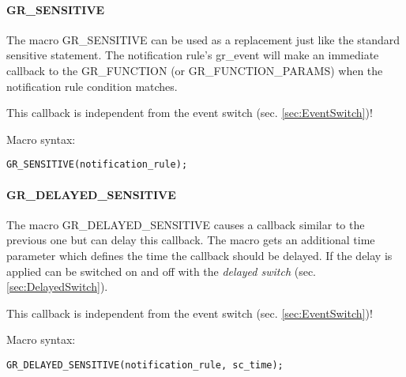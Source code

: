 \paragraph{{\sffamily GR\_SENSITIVE}} The macro {\sffamily GR\_SENSITIVE} can be used as a replacement just like the standard sensitive statement. The notification rule's {\sffamily gr\_event} will make an immediate callback to the {\sffamily GR\_FUNCTION} (or {\sffamily GR\_FUNCTION\_PARAMS}) when the notification rule condition matches. 

This callback is independent from the event switch (sec. \ref{sec:EventSwitch})!

\noindent
\begin{minipage}{\textwidth}
Macro syntax:
\vspace{-1ex}
\begin{lstlisting}
GR_SENSITIVE(notification_rule);
\end{lstlisting}
\end{minipage}

\paragraph{{\sffamily GR\_DELAYED\_SENSITIVE}} The macro {\sffamily GR\_DELAYED\_SENSITIVE} causes a callback similar to the previous one but can delay this callback. The macro gets an additional time parameter which defines the time the callback should be delayed. If the delay is applied can be switched on and off with the {\em delayed switch} (sec. \ref{sec:DelayedSwitch}).

This callback is independent from the event switch (sec. \ref{sec:EventSwitch})!


\noindent
\begin{minipage}{\textwidth}
Macro syntax:
\vspace{-1ex} 
\begin{lstlisting}
GR_DELAYED_SENSITIVE(notification_rule, sc_time);
\end{lstlisting}
\end{minipage}

